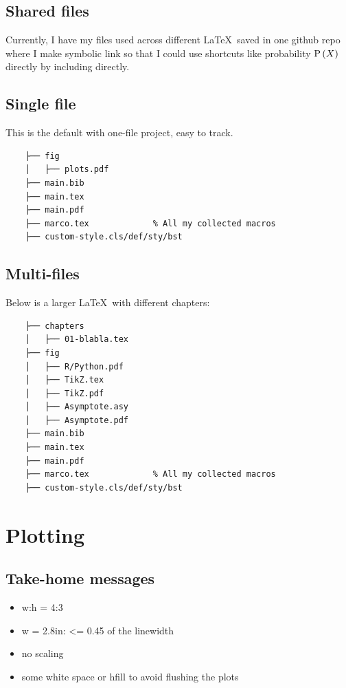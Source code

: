 \documentclass[aos,preprint]{imsart}
\begin{document}
\subsection{Shared files}

Currently, I have my files used across different \LaTeX\ saved in one
github repo where I make symbolic link so that I could use shortcuts like probability
$\operatorname{\mathrm{P}} \left( {X} \right)$ directly by including directly.

\subsection{Single file}

This is the default with one-file project, easy to track.

\begin{Verbatim}
	├── fig
	│   ├── plots.pdf
	├── main.bib
	├── main.tex
	├── main.pdf
	├── marco.tex             % All my collected macros
	├── custom-style.cls/def/sty/bst
\end{Verbatim}

\subsection{Multi-files}

Below is a larger \LaTeX\ with different chapters:

\begin{Verbatim}
	├── chapters
	│   ├── 01-blabla.tex
	├── fig
	│   ├── R/Python.pdf
	│   ├── TikZ.tex
	│   ├── TikZ.pdf
	│   ├── Asymptote.asy
	│   ├── Asymptote.pdf
	├── main.bib
	├── main.tex
	├── main.pdf
	├── marco.tex             % All my collected macros
	├── custom-style.cls/def/sty/bst
\end{Verbatim}


\section{Plotting}

\subsection{Take-home messages}

\begin{itemize}
	\item w:h = 4:3
	\item w = 2.8in: <= 0.45 of the linewidth
	\item no scaling
	\item some white space or hfill to avoid flushing the plots
\end{itemize}
\end{document}
